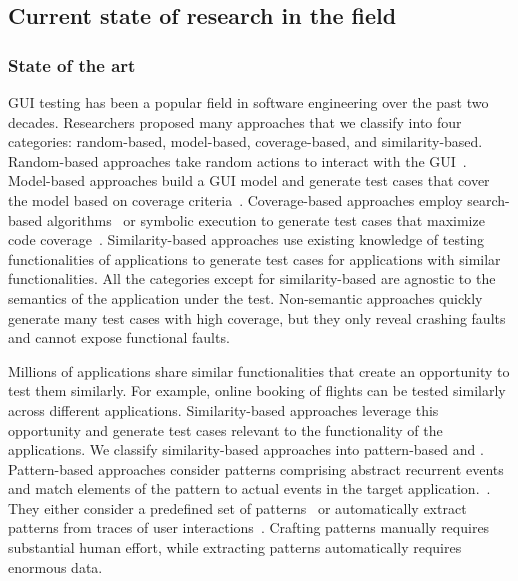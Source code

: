 \subsection{Current state of research in the field }



\subsubsection{State of the art}
GUI testing has been a popular field in software engineering over the past two decades. Researchers proposed many approaches that we classify into four categories: random-based, model-based, coverage-based, and similarity-based.
Random-based approaches take random actions to interact with the GUI~\cite{machiry:dynodroid:FSE:2013,vos:testar:ijismd:2015,ermuth:monkey:ISSTA:2016}.
Model-based approaches build a GUI model and generate test cases that cover the model based on coverage criteria~\cite{Nguyen:GUITAR:ASEJ:2014,Li:DroidiBot:ICSE-C:2017,Gu:PractivalTest:ICSE:2019,Choi:swift:OOPSLA:2013}. 
Coverage-based approaches employ search-based algorithms~\cite{Gross:exist:ISSTA:2012,mahmood:evodroid:FSE:2014,dong:TimaMachine:ICSE:2020} or symbolic execution to generate test cases that maximize code coverage~\cite{Ganov:GUIsymbolic:FMSE:2009,cheng:guicat:ASE:2016,Anand:conc:FSE:2012}.
Similarity-based approaches use existing knowledge of testing functionalities of applications to generate test cases for applications with similar functionalities.
All the categories except for similarity-based are agnostic to the semantics of the application under the test. 
Non-semantic approaches quickly generate many test cases with high coverage, but they only reveal crashing faults and cannot expose functional faults.

\smallskip 
Millions of applications share similar functionalities that create an opportunity to test them similarly.
For example, online booking of flights can be tested similarly across different applications. 
Similarity-based approaches leverage this opportunity and generate test cases relevant to the functionality of the applications.
We classify similarity-based approaches into pattern-based and \testreuse.
Pattern-based approaches consider patterns comprising abstract recurrent events and match elements of the pattern to actual events in the target application.~\cite{Moreira:pattern:ISSRE:2013,Morgado:Impact:HCI:2019}.
They either consider a predefined set of patterns~\cite{Mariani:Augusto:ICSE:2018,Hu:appflow:FSE:2018} or automatically extract patterns from traces of user interactions~\cite{linares:mining:MSR:2015,mao:crowd:ASE:2017,Mao:UserPattern:JSS:2021}.
Crafting patterns manually requires substantial human effort, while extracting patterns automatically requires enormous data.


